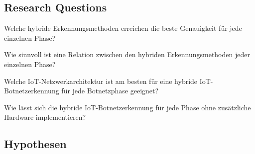 \subsection{Research Questions}


\begin{questions}
    \item Welche hybride Erkennungsmethoden erreichen die beste Genauigkeit für jede einzelnen Phase?
    \item Wie sinnvoll ist eine Relation zwischen den hybriden Erkennungsmethoden jeder einzelnen Phase?
    \item Welche IoT-Netzwerkarchitektur ist am besten für eine hybride IoT-Botnetzerkennung für jede Botnetzphase geeignet?
    \item Wie lässt sich die hybride IoT-Botnetzerkennung für jede Phase ohne zusätzliche Hardware implementieren?
\end{questions}

\subsection{Hypothesen}


\begin{hypotheses}
    \item
\end{hypotheses}